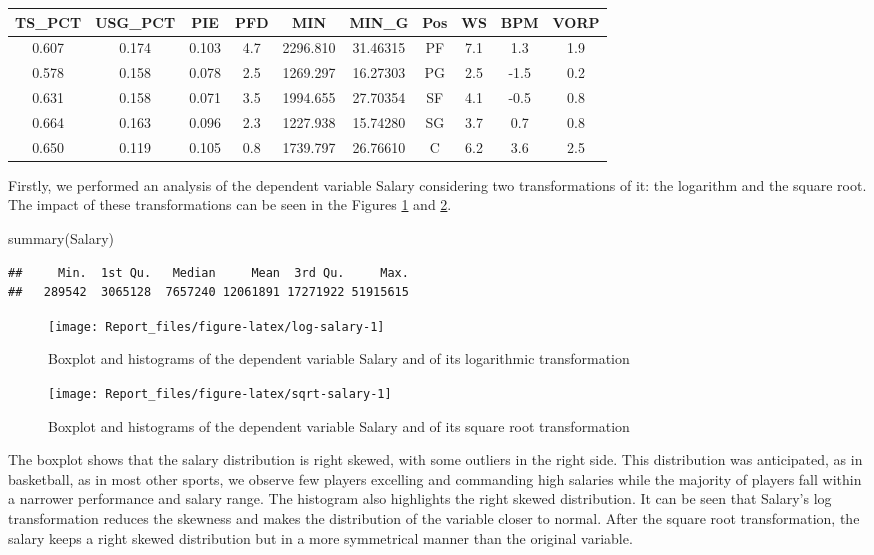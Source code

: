 \documentclass[
]{article}
\newenvironment{Shaded}{\begin{snugshade}}{\end{snugshade}}
\newcommand{\FunctionTok}[1]{\textcolor[rgb]{0.00,0.00,0.00}{#1}}
\newcommand{\NormalTok}[1]{#1}
\begin{document}
\begin{longtable}[]{@{}cccccccccc@{}}
\toprule()
TS\_PCT & USG\_PCT & PIE & PFD & MIN & MIN\_G & Pos & WS & BPM & VORP \\
\midrule()
\endhead
0.607 & 0.174 & 0.103 & 4.7 & 2296.810 & 31.46315 & PF & 7.1 & 1.3 &
1.9 \\
0.578 & 0.158 & 0.078 & 2.5 & 1269.297 & 16.27303 & PG & 2.5 & -1.5 &
0.2 \\
0.631 & 0.158 & 0.071 & 3.5 & 1994.655 & 27.70354 & SF & 4.1 & -0.5 &
0.8 \\
0.664 & 0.163 & 0.096 & 2.3 & 1227.938 & 15.74280 & SG & 3.7 & 0.7 &
0.8 \\
0.650 & 0.119 & 0.105 & 0.8 & 1739.797 & 26.76610 & C & 6.2 & 3.6 &
2.5 \\
\bottomrule()
\end{longtable}

Firstly, we performed an analysis of the dependent variable Salary
considering two transformations of it: the logarithm and the square
root. The impact of these transformations can be seen in the Figures
\ref{fig:log-salary} and \ref{fig:sqrt-salary}.

\begin{Shaded}
\begin{Highlighting}[]
\FunctionTok{summary}\NormalTok{(Salary)}
\end{Highlighting}
\end{Shaded}

\begin{verbatim}
##     Min.  1st Qu.   Median     Mean  3rd Qu.     Max. 
##   289542  3065128  7657240 12061891 17271922 51915615
\end{verbatim}

\begin{figure}
\texttt{[image: Report\_files/figure-latex/log-salary-1]} \caption{Boxplot and histograms of the dependent variable Salary and of its logarithmic transformation \label{fig:log-salary}}\label{fig:log-salary}
\end{figure}

\begin{figure}
\texttt{[image: Report\_files/figure-latex/sqrt-salary-1]} \caption{Boxplot and histograms of the dependent variable Salary and of its square root transformation \label{fig:sqrt-salary}}\label{fig:sqrt-salary}
\end{figure}

The boxplot shows that the salary distribution is right skewed, with
some outliers in the right side. This distribution was anticipated, as
in basketball, as in most other sports, we observe few players excelling
and commanding high salaries while the majority of players fall within a
narrower performance and salary range. The histogram also highlights the
right skewed distribution. It can be seen that Salary's log
transformation reduces the skewness and makes the distribution of the
variable closer to normal. After the square root transformation, the
salary keeps a right skewed distribution but in a more symmetrical
manner than the original variable.
\end{document}
